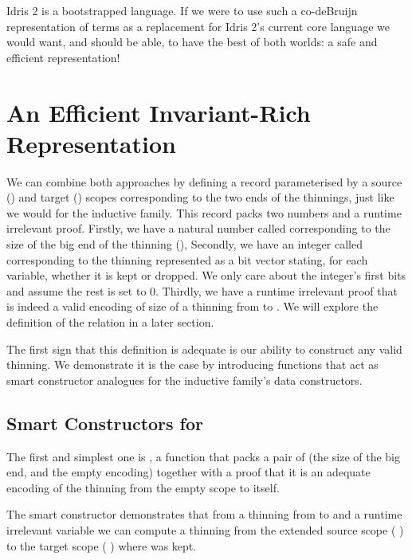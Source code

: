 \documentclass{article}
\newcommand{\idris}{Idris 2}
\begin{document}
\idris{} is a bootstrapped language. If we were to use such a co-deBruijn representation
of terms as a replacement for \idris{}'s current core language we would want, and should
be able, to have the best of both worlds: a safe and efficient representation!

\section{An Efficient Invariant-Rich Representation}

We can combine both approaches by defining a record parameterised by a source
() and target () scopes corresponding to the two
ends of the thinnings, just like we would for the inductive family. This record
packs two numbers and a runtime irrelevant proof.
%
Firstly, we have a natural number called  corresponding
to the size of the big end of the thinning (),
%
Secondly, we have an integer called  corresponding to
the thinning represented as a bit vector stating, for each variable, whether
it is kept or dropped. We only care about the integer's 
first bits and assume the rest is set to 0.
%
Thirdly, we have a runtime irrelevant proof  that
 is indeed a valid encoding of size 
of a thinning from  to . We will explore the
definition of the relation  in a later section.


The first sign that this definition is adequate is our ability to construct
any valid thinning. We demonstrate it is the case by introducing functions
that act as smart constructor analogues for the inductive family's data
constructors.

\subsection{Smart Constructors for }

The first and simplest one is , a function that packs a pair of
 (the size of the big end, and the empty encoding) together with a proof
that it is an adequate encoding of the thinning from the empty scope to itself.


The  smart constructor demonstrates that from a thinning from
 to  and a runtime irrelevant variable 
we can compute a thinning from the extended source scope
( \IdrisData{:<} ) to the target scope
( \IdrisData{:<} ) where  was kept.
\end{document}
